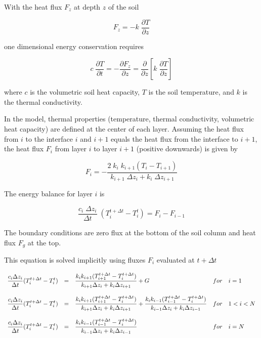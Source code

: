 With the heat flux $F_z$ at depth $z$ of the soil 

\begin{equation}
F_z = -k \; \frac{\partial T}{\partial z}
\end{equation}

one dimensional energy conservation requires   

\begin{equation}
c\;  \frac{\partial T} {\partial t} = - \frac{\partial
F_z}{\partial
z}= \frac{\partial}{\partial z} \left [ k \; 
\frac{\partial T}{\partial z} \right]
\end{equation}

where $c$ is the volumetric soil heat capacity, $T$
is the soil temperature, and $k$ is the
thermal conductivity. 

In the model,  thermal properties (temperature,
thermal conductivity, volumetric heat capacity) are
defined at the center of each layer. Assuming the
heat flux from $i$ to the interface $i$ and $i+1$
equals the heat flux from the interface to $i+1$, the
heat flux $F_i$ from layer $i$ to layer $i+1$ 
(positive downwards) is given by 

\begin{equation}
F_i= - \frac{2\; k_i\;  k_{i+1} (T_i -
T_{i+1})}{k_{i+1} \; \Delta z_i + k_i\;  \Delta z_{i+1}}
\end{equation} 

The energy balance for layer $i$ is 

\begin{equation}
\frac{c_i\;  \Delta z_i}{\Delta t} \; (T_i^{t+\Delta t} -
T_i ^{t})  = F_i - F_{i-1}
\end{equation}


The boundary conditions are zero flux at the bottom
of the soil column and heat flux $F_g$  at the top.

This equation is solved implicitly using fluxes
$F_i$ evaluated at $t+\Delta t$

\begin{equation}
\begin{array}{lclcl}
\displaystyle \frac{c_i \Delta z_i}{\Delta t} (T_i^{t+\Delta t} -
T_i ^{t})  & = &\displaystyle  \frac{k_i k_{i+1}
(T_{i+1}^{t+\Delta
t} - T_i^{t+\Delta t})}{k_{i+1} \Delta z_i + k_i
\Delta z_{i+1}} +  G & for  & \displaystyle  i = 1 \\
& & & &  \\
\displaystyle \frac{c_i \Delta z_i}{\Delta t} (T_i^{t+\Delta t} -
T_i ^{t}) &  = &\displaystyle  \frac{k_i k_{i+1}
(T_{i+1}^{t+\Delta
t} - T_i^{t+\Delta t})}{k_{i+1} \Delta z_i + k_i
\Delta z_{i+1}} +  \frac{k_i k_{i-1} (T_{i-
1}^{t+\Delta t} - T_i^{t+\Delta t})}{k_{i-1} \Delta
z_i + k_i \Delta z_{i-1}} & for & \displaystyle 1 < i < N \\
& & & & \\
\displaystyle \frac{c_i \Delta z_i}{\Delta t} (T_i^{t+\Delta t} -
T_i ^{t}) &  = &\displaystyle  \frac{k_i k_{i-1} (T_{i-
1}^{t+\Delta t} - T_i^{t+\Delta t})}{k_{i-1} \Delta
z_i + k_i \Delta z_{i-1}} & for & \displaystyle i = N 
\end{array}
\end{equation}

